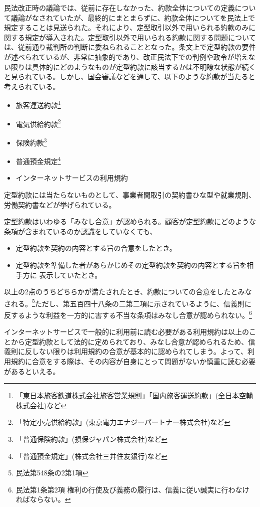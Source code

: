 民法改正時の議論では、従前に存在しなかった、約款全体についての定義について議論がなされていたが、最終的にまとまらずに、約款全体についてを民法上で規定することは見送られた。それにより、定型取引以外で用いられる約款のみに関する規定が導入された。定型取引以外で用いられる約款に関する問題については、従前通り裁判所の判断に委ねられることとなった。\cite{国民生活no89}条文上で定型約款の要件が述べられているが、非常に抽象的であり、改正民法下での判例や政令が増えない限りは具体的にどのようなものが定型約款に該当するかは不明瞭な状態が続くと見られている。しかし、国会審議などを通して、以下のような約款が当たると考えられている。\cite{改正民法の定型約23:online}
\begin{itemize}
  \item 旅客運送約款\footnote{「東日本旅客鉄道株式会社旅客営業規則」「国内旅客運送約款」(全日本空輸株式会社)など}
  \item 電気供給約款\footnote{「特定小売供給約款」(東京電力エナジーパートナー株式会社)など}
  \item 保険約款\footnote{「普通保険約款」(損保ジャパン株式会社)など}
  \item 普通預金規定\footnote{「普通預金規定」(株式会社三井住友銀行)など}
  \item インターネットサービスの利用規約
\end{itemize}
定型約款には当たらないものとして、事業者間取引の契約書ひな型や就業規則、労働契約書などが挙げられている。

定型約款はいわゆる「みなし合意」が認められる。顧客が定型約款にどのような条項が含まれているのか認識をしていなくても、
\begin{itemize}
  \item 定型約款を契約の内容とする旨の合意をしたとき。
  \item 定型約款を準備した者があらかじめその定型約款を契約の内容とする旨を相手方に
  表示していたとき。
\end{itemize}
以上の2点のうちどちらかが満たされたとき、約款についての合意をしたとみなされる。\footnote{民法第548条の2第1項}ただし、第五百四十八条の二第二項に示されているように、信義則に反するような利益を一方的に害する不当な条項はみなし合意が認められない。\footnote{民法第1条第2項 権利の行使及び義務の履行は、信義に従い誠実に行わなければならない。}


インターネットサービスで一般的に利用前に読む必要がある利用規約は以上のことから定型約款として法的に定められており、みなし合意が認められるため、信義則に反しない限りは利用規約の合意が基本的に認められてしまう。よって、利用規約に合意をする際は、その内容が自身にとって問題がないか慎重に読む必要があるといえる。

